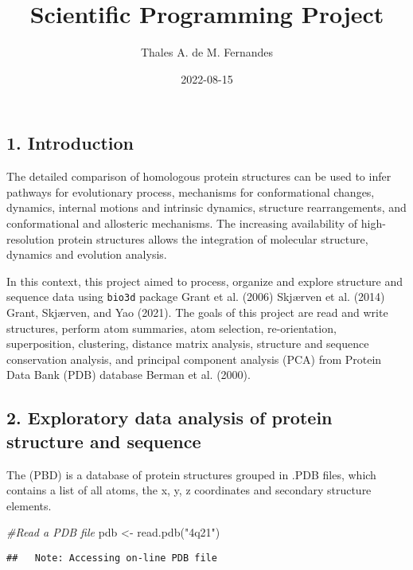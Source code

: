 \documentclass[
]{article}
\title{Scientific Programming Project}
\author{Thales A. de M. Fernandes}
\date{2022-08-15}
\newenvironment{Shaded}{\begin{snugshade}}{\end{snugshade}}
\newcommand{\CommentTok}[1]{\textcolor[rgb]{0.56,0.35,0.01}{\textit{#1}}}
\newcommand{\FunctionTok}[1]{\textcolor[rgb]{0.00,0.00,0.00}{#1}}
\newcommand{\NormalTok}[1]{#1}
\newcommand{\OtherTok}[1]{\textcolor[rgb]{0.56,0.35,0.01}{#1}}
\newcommand{\StringTok}[1]{\textcolor[rgb]{0.31,0.60,0.02}{#1}}
\begin{document}
\maketitle

\hypertarget{introduction}{%
\subsection{1. Introduction}\label{introduction}}

The detailed comparison of homologous protein structures can be used to
infer pathways for evolutionary process, mechanisms for conformational
changes, dynamics, internal motions and intrinsic dynamics, structure
rearrangements, and conformational and allosteric mechanisms. The
increasing availability of high-resolution protein structures allows the
integration of molecular structure, dynamics and evolution analysis.

In this context, this project aimed to process, organize and explore
structure and sequence data using \texttt{bio3d} package Grant et al.
(2006) Skjærven et al. (2014) Grant, Skjærven, and Yao (2021). The goals
of this project are read and write structures, perform atom summaries,
atom selection, re-orientation, superposition, clustering, distance
matrix analysis, structure and sequence conservation analysis, and
principal component analysis (PCA) from Protein Data Bank (PDB) database
Berman et al. (2000).

\hypertarget{exploratory-data-analysis-of-protein-structure-and-sequence}{%
\subsection{2. Exploratory data analysis of protein structure and
sequence}\label{exploratory-data-analysis-of-protein-structure-and-sequence}}

The (PBD) is a database of protein structures grouped in .PDB files,
which contains a list of all atoms, the x, y, z coordinates and
secondary structure elements.

\begin{Shaded}
\begin{Highlighting}[]
\CommentTok{\#Read a PDB file }
\NormalTok{pdb }\OtherTok{\textless{}{-}} \FunctionTok{read.pdb}\NormalTok{(}\StringTok{"4q21"}\NormalTok{)}
\end{Highlighting}
\end{Shaded}

\begin{verbatim}
##   Note: Accessing on-line PDB file
\end{verbatim}
\end{document}
